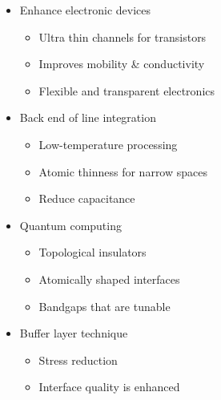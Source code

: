 \documentclass[conference]{IEEEtran}
\begin{document}
\begin{itemize}

  \item Enhance electronic devices 

    \begin{itemize}

      \item Ultra thin channels for transistors 

      \item Improves mobility \& conductivity 

      \item Flexible and transparent electronics 

    \end{itemize}

  \item Back end of line integration 

    \begin{itemize}

      \item Low-temperature processing 

      \item Atomic thinness for narrow spaces 

      \item Reduce capacitance 

    \end{itemize}

  \item Quantum computing 

    \begin{itemize}

      \item Topological insulators 

      \item Atomically shaped interfaces 

      \item Bandgaps that are tunable 

    \end{itemize}

  \item Buffer layer technique 

    \begin{itemize}

      \item Stress reduction

      \item Interface quality is enhanced

    \end{itemize}

\end{itemize}
\end{document}
